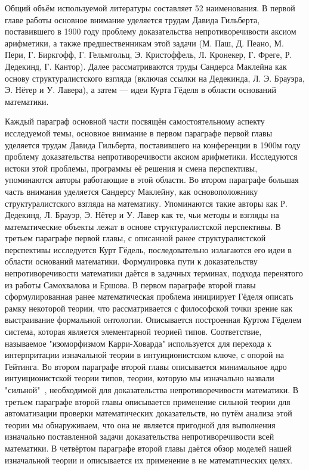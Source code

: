 	Общий объём используемой литературы составляет 52 наименования. В первой главе работы основное внимание уделяется трудам Давида Гильберта, поставившего в 1900 году проблему доказательства непротиворечивости аксиом арифметики, а также предшественникам этой задачи (М. Паш, Д. Пеано, М. Пери, Г. Биркгофф, Г. Гельмгольц, Э. Кристоффель, Л. Кронекер, Г. Фреге, Р. Дедекинд, Г. Кантор). Далее рассматриваются труды Сандерса Маклейна как основу структуралистского взгляда (включая ссылки на Дедекинда, Л. Э. Брауэра, Э. Нётер и У. Лавера), а затем — идеи Курта Гёделя в области оснований математики.
		
	Каждый параграф основной части посвящён самостоятельному аспекту исследуемой темы, основное внимание в первом параграфе первой главы уделяется трудам Давида Гильберта, поставившего на конференции в 1900м году проблему доказательства непротиворечивости аксиом арифметики.  Исследуются истоки этой проблемы, программы её решения и смена перспективы, упоминаются авторы работающие в этой области. Во втором параграфе большая часть внимания уделяется Сандерсу Маклейну, как основоположнику структуралистского взгляда на математику. Упоминаются такие авторы как Р. Дедекинд, Л. Брауэр, Э. Нётер и У. Лавер как те, чьи методы и взгляды на математические объекты лежат в основе структуралистской перспективы. В третьем параграфе первой главы, с описанной ранее структуралистской перспективы исследуется Курт Гёдель, последовательно излагаются его идеи в области оснований математики. Формулировка пути к доказательству непротиворечивости математики даётся в задачных терминах, подхода перенятого из работы \cite{Samohvalov} Самохвалова и Ершова.
	В первом параграфе второй главы сформулированная ранее математическая проблема инициирует Гёделя описать рамку некоторой теории, что рассматривается с философской точки зрение как выстраивание формальной онтологии. Описывается построенная Куртом Гёделем система, которая является элементарной теорией типов. Соответствие, называемое "изоморфизмом Карри-Ховарда" используется для перехода к интерпритации изначальной теории в интуиционистском ключе, с опорой на Гейтинга. Во втором параграфе второй главы описывается минимальное ядро интуиционистской теории типов, теории, которую мы изначально назвали "сильной"\  , необходимой для доказательства непротиворечивости математики. В третьем параграфе второй главы описывается применение сильной теории для автоматизации проверки математических доказательств, но путём анализа этой теории мы обнаруживаем, что она не является пригодной для выполнения изначально поставленной задачи доказательства непротиворечивости всей математики. В четвёртом параграфе второй главы даётся обзор моделей нашей изначальной теории и описывается их применение в не математических целях.
